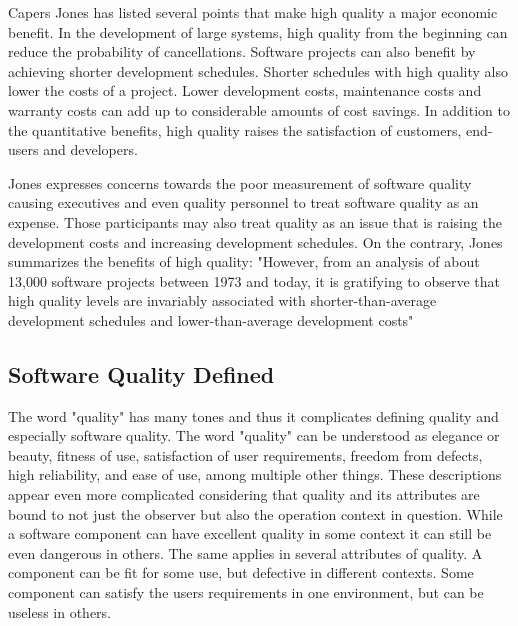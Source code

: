Capers Jones has listed several points that make high quality a major economic benefit. In the development of large systems, high quality from the beginning can reduce the probability of cancellations. Software projects can also benefit by achieving shorter development schedules. Shorter schedules with high quality also lower the costs of a project. Lower development costs, maintenance costs and warranty costs can add up to considerable amounts of cost savings. In addition to the quantitative benefits, high quality raises the satisfaction of customers, end-users and developers. 

Jones expresses concerns towards the poor measurement of software quality causing executives and even quality personnel to treat software quality as an expense. Those participants may also treat quality as an issue that is raising the development costs and increasing development schedules. On the contrary, Jones summarizes the benefits of high quality: "However, from an analysis of about 13,000 software projects between 1973 and today, it is gratifying to observe that high quality levels are invariably associated with shorter-than-average development schedules and lower-than-average development costs"~\cite{jones2011economics}

 

\subsection{Software Quality Defined}

The word "quality" has many tones and thus it complicates defining quality and especially software quality. The word "quality" can be understood as elegance or beauty, fitness of use, satisfaction of user requirements, freedom from defects, high reliability, and ease of use, among multiple other things. These descriptions appear even more complicated considering that quality and its attributes are bound to not just the observer but also the operation context in question. While a software component can have excellent quality in some context it can still be even dangerous in others. The same applies in several attributes of quality. A component can be fit for some use, but defective in different contexts. Some component can satisfy the users requirements in one environment, but can be useless in others.~\cite{jones2011economics}

